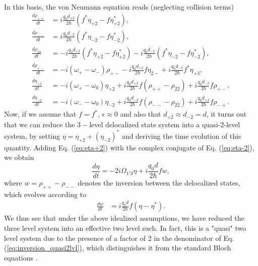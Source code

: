 \documentclass[]{spie}  %
\begin{document}
In this basis, the von Neumann equation reads (neglecting collision terms)
\begin{subequations} \begin{align} \frac{d \rho_{++}}{dt} &=
 	i\frac{q_0d_{+2}}{2\hbar}(f^*\eta_{+2}-f\eta_{+2}^*), \\ \frac{d \rho_{--}}{dt}
 	&= i\frac{q_0d_{-2}}{2\hbar}(f^*\eta_{-2}-f\eta_{-2}^*), \\ \frac{d
 		\rho_{22}}{dt} &=
 	-i\frac{q_0d_{+2}}{2\hbar}(f^*\eta_{+2}-f\eta_{+2}^*)-i\frac{q_0d_{-2}}{2\hbar}(f^*\eta_{-2}-f\eta_{-2}^*),
 	\\ \frac{d \rho_{+-}}{dt} &=
 	-i(\omega_+-\omega_-)\rho_{+-}-i\frac{q_0d_{+2}}{2\hbar}f\eta_{2-}+i\frac{q_0d_{-2}}{2\hbar}f^*\eta_{+3},\\
 	\frac{d \eta_{+2}}{dt} &=
 	-i(\omega_+-\omega_0)\eta_{+2}+i\frac{q_0d_{+2}}{2\hbar}f(\rho_{++}-\rho_{22})+i\frac{q_0d_{-2}}{2\hbar}f\rho_{+-},
 	\label{eq:eta+2}\\ \frac{d \eta_{-2}}{dt} &=
 	-i(\omega_--\omega_0)\eta_{-2}+i\frac{q_0d_{-2}}{2\hbar}f(\rho_{--}-\rho_{22})+i\frac{q_0d_{+2}}{2\hbar}f\rho_{-+}.
 	\label{eq:eta-2} \end{align} \end{subequations} Now, if we assume that $f =
f^*$,  $\epsilon \approx 0$ and also that $d_{+2}\approx d_{-2} = d$, it turns
out that we can reduce the $3-$level delocalized state system into a
quasi-2-level system, by setting  $\eta = \eta_{+2}+(\eta_{-2})^*$ and deriving
the time evolution of this quantity. Adding Eq. (\ref{eq:eta+2}) with the
complex conjugate of Eq. (\ref{eq:eta-2}), we obtain \begin{equation}
\label{eq:coherence_quasi2lvl} \frac{d \eta}{dt} = -2i\Omega_{1'3} \eta +
i\frac{q_0d}{2\hbar}fw, \end{equation} where $w = \rho_{++}-\rho_{--}$ denotes
the inversion between the delocalized states, which	 evolves according to
\begin{align} \label{eq:inversion_quasi2lvl} \frac{d w }{dt}	&=
i\frac{q_0d}{2\hbar}f(\eta-\eta^*).  \end{align} We thus see that under the
above idealized assumptions, we have reduced the three level system into an
effective two level such. In fact, this is a "quasi" two level system due to
the presence of a factor of 2 in the denominator of Eq.
(\ref{eq:inversion_quasi2lvl}), which distinguishes it from the standard Bloch
equations \cite{boyd2003nonlinear}.
\end{document}
